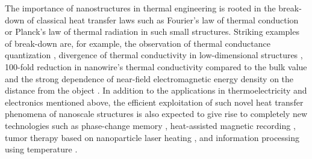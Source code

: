 The importance of nanostructures in thermal engineering is rooted in the break-down of classical heat transfer laws such as Fourier's law of thermal conduction \cite{fourier} or Planck's law of thermal radiation \cite{planck00a} in such small structures. Striking examples of break-down are, for example, the observation of thermal conductance quantization \cite{rego98,schwab00}, divergence of thermal conductivity in low-dimensional structures \cite{lepri97,lepri03,dhar08,xu14}, 100-fold reduction in nanowire's thermal conductivity compared to the bulk value \cite{hochbaum08} and the strong dependence of near-field electromagnetic energy density on the distance from the object \cite{}. In addition to the applications in thermoelectricity and electronics mentioned above, the efficient exploitation of such novel heat transfer phenomena of nanoscale structures is also expected to give rise to completely new technologies such as phase-change memory \cite{lankhorst05}, heat-assisted magnetic recording \cite{pan09}, tumor therapy based on nanoparticle laser heating \cite{avedisian09}, and information processing using temperature \cite{li12_rmp}.  %






